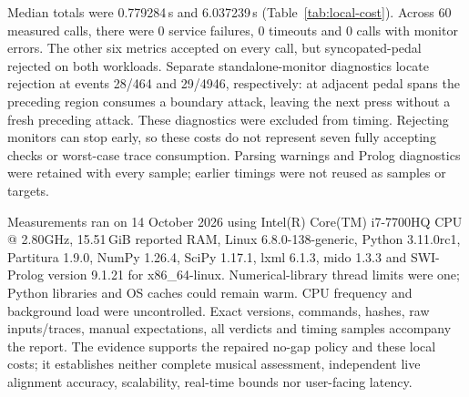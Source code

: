 Median totals were 0.779284\,s and 6.037239\,s
(Table~\ref{tab:local-cost}). Across 60 measured calls,
there were 0 service failures, 0 timeouts and
0 calls with monitor errors. The other six metrics accepted
on every call, but syncopated-pedal rejected on both workloads.
Separate standalone-monitor diagnostics locate rejection at events
28/464 and
29/4946,
respectively: at adjacent pedal spans the preceding region consumes a
boundary attack, leaving the next press without a fresh preceding attack.
These diagnostics were excluded from timing. Rejecting monitors can stop
early, so these costs do not represent seven fully accepting checks or
worst-case trace consumption. Parsing warnings and Prolog diagnostics were
retained with every sample; earlier timings were not reused as samples or targets.

Measurements ran on 14 October 2026 using
Intel(R) Core(TM) i7-7700HQ CPU @ 2.80GHz, 15.51\,GiB reported RAM, Linux 6.8.0-138-generic,
Python 3.11.0rc1, Partitura 1.9.0, NumPy 1.26.4, SciPy 1.17.1, lxml 6.1.3, mido 1.3.3 and
SWI-Prolog version 9.1.21 for x86\_64-linux. Numerical-library thread limits were
one; Python libraries and OS caches could remain warm. CPU frequency and
background load were uncontrolled. Exact versions, commands, hashes, raw
inputs/traces, manual expectations, all verdicts and timing samples accompany
the report. The evidence supports the repaired no-gap policy and these local
costs; it establishes neither complete musical assessment, independent live
alignment accuracy, scalability, real-time bounds nor user-facing latency.
